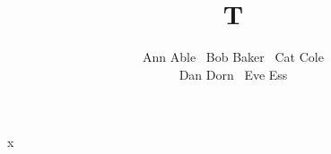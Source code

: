 \documentclass{ecai}
\begin{document}
\title{T}
\author{Ann Able \ Bob Baker \ Cat Cole \\
Dan Dorn \ Eve Ess}
\maketitle
x
\end{document}
